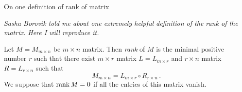 



\baselineskip=14pt
\def\vare {\varepsilon}
\def\A {{\bf A}}
\def\t {\tilde}
\def\a {\alpha}
\def\K {{\bf K}}
\def\N {{\bf N}}
\def\V {{\cal V}}
\def\s {{\sigma}}
\def\S {{\Sigma}}
\def\s {{\sigma}}
\def\p{\partial}
\def\vare{{\varepsilon}}
\def\Q {{\bf Q}}
\def\D {{\cal D}}
\def\G {{\Gamma}}
\def\C {{\bf C}}
\def\M {{\cal M}}
\def\Z {{\bf Z}}
\def\U  {{\cal U}}
\def\H {{\cal H}}
\def\R  {{\bf R}}
\def\S  {{\bf S}}
\def\E  {{\bf E}}
\def\l {\lambda}
\def\ll {{\bf l}}
\def\degree {{\bf {\rm degree}\,\,}}
\def \finish {${\,\,\vrule height1mm depth2mm width 8pt}$}
\def \m {\medskip}
\def\p {\partial}
\def\r {{\bf r}}
\def\pt {{\bf p}}
\def\v {{\bf v}}
\def\n {{\bf n}}
\def\t {{\bf t}}
\def\b {{\bf b}}
\def\c {{\bf c }}
\def\e{{\bf e}}
\def\ac {{\bf a}}
\def \X   {{\bf X}}
\def \Y   {{\bf Y}}
\def \x   {{\bf x}}
\def \y   {{\bf y}}
\def \G{{\cal G}}



\centerline {On one definition of rank of matrix}

{\it Sasha Borovik told me about one extremely helpful definition of the
rank of the matrix. Here I will reproduce it.}

Let  $M=M_{m\times n}$  be $m\times n$  matrix.
     Then
{\it rank} of $M$ is the minimal positive number $r$ such that
there exist $m\times r$  matrix $L=L_{m\times r}$
and
 $r\times n$  matrix $R=L_{r\times n}$ such that
        $$
     M_{m\times n}=L_{m\times r}\circ R_{r\times n}\,.
            $$
We suppose  that ${\rm rank\,} M=0$ if all the entries of this 
matrix vanish.


\bye
